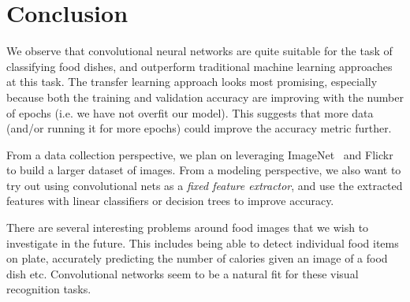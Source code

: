 \section{Conclusion}
\label{sec:conclusion}

We observe that convolutional neural networks are quite suitable for the task of classifying food dishes, and outperform traditional machine learning approaches at this task. The transfer learning approach looks most promising, especially because both the training and validation accuracy are improving with the number of epochs (i.e. we have not overfit our model). This suggests that more data (and/or running it for more epochs) could improve the accuracy metric further. 

From a  data collection perspective, we plan on leveraging ImageNet~\cite{imagenet} and Flickr~\cite{flickr} to build a larger dataset of images. From a modeling perspective, we also want to try out using convolutional nets as a \textit{fixed feature extractor}, and use the extracted features with linear classifiers or decision trees to improve accuracy. 

There are several interesting problems around food images that we wish to investigate in the future. This includes being able to detect individual food items on plate, accurately predicting the number of calories given an image of a food dish etc. Convolutional networks seem to be a natural fit for these visual recognition tasks.  
